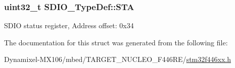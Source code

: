 \subsubsection[{\texorpdfstring{S\+TA}{STA}}]{ uint32\+\_\+t S\+D\+I\+O\+\_\+\+Type\+Def\+::\+S\+TA}\hypertarget{struct_s_d_i_o___type_def_a6b917b09c127e77bd3128bbe19a00499}{}\label{struct_s_d_i_o___type_def_a6b917b09c127e77bd3128bbe19a00499}
S\+D\+IO status register, Address offset\+: 0x34 

The documentation for this struct was generated from the following file\+:\begin{DoxyCompactItemize}
\item 
Dynamixel-\/\+M\+X106/mbed/\+T\+A\+R\+G\+E\+T\+\_\+\+N\+U\+C\+L\+E\+O\+\_\+\+F446\+R\+E/\hyperlink{stm32f446xx_8h}{stm32f446xx.\+h}\end{DoxyCompactItemize}
